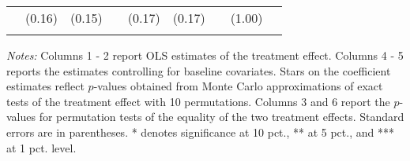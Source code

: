 \begin{table}[h]
{\begin{threeparttable}
\begin{tabular}{l*{8}{c}}
          &   (0.16)&   (0.15)&         &   (0.17)&   (0.17)&         &   (1.00)&         \\
          &         &         &         &         &         &         &         &         \\
\bottomrule \end{tabular} \begin{tablenotes}[flushleft] \footnotesize \item \emph{Notes:} Columns 1 - 2 report OLS estimates of the treatment effect. Columns 4 - 5 reports the estimates controlling for baseline covariates. Stars on the coefficient estimates reflect \(p\)-values obtained from Monte Carlo approximations of exact tests of the treatment effect with 10 permutations. Columns 3 and 6 report the \(p\)-values for permutation tests of the equality of the two treatment effects. Standard errors are in parentheses. * denotes significance at 10 pct., ** at 5 pct., and *** at 1 pct. level. \end{tablenotes} \end{threeparttable} } \end{table}

